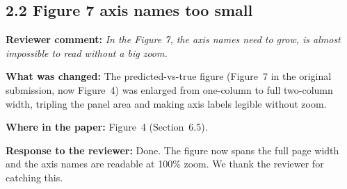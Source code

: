 \documentclass[11pt,a4paper]{article}
\newcommand{\comment}[1]{\textbf{Reviewer comment:} \textit{#1}}
\newcommand{\change}[1]{\textbf{What was changed:} #1}
\newcommand{\where}[1]{\textbf{Where in the paper:} #1}
\newcommand{\resp}[1]{\textbf{Response to the reviewer:} \textcolor{revblue}{#1}}
\newcommand{\pt}[1]{\subsection*{#1}}
\begin{document}
\pt{2.2 Figure 7 axis names too small}
\comment{In the Figure 7, the axis names need to grow, is almost impossible to read without a big zoom.}

\change{The predicted-vs-true figure (Figure~7 in the original submission, now Figure~4) was enlarged from one-column to full two-column width, tripling the panel area and making axis labels legible without zoom.}

\where{Figure~4 (Section~6.5).}

\resp{Done. The figure now spans the full page width and the axis names are readable at 100\% zoom. We thank the reviewer for catching this.}
\end{document}
